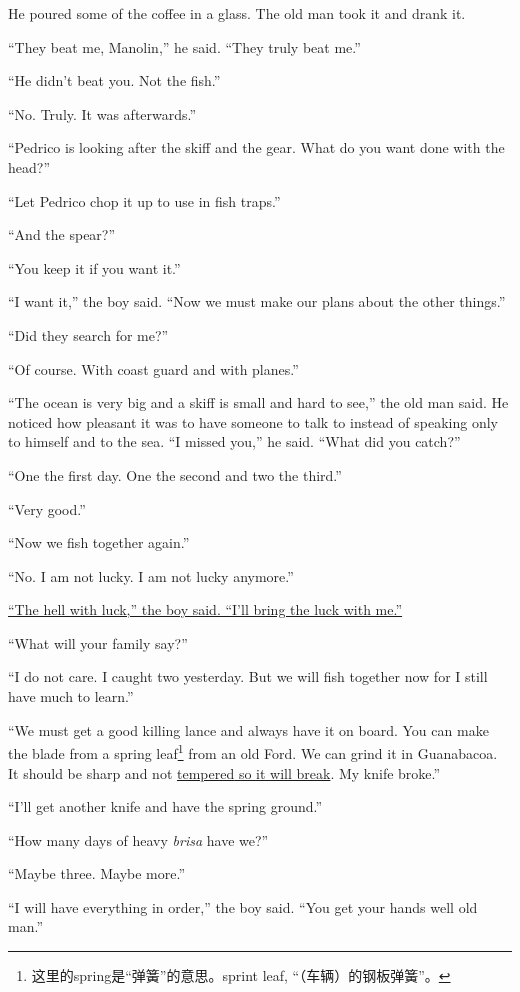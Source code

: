 He poured some of the coffee in a glass. The old man took it and drank it.

``They beat me, Manolin,'' he said. ``They truly beat me.''

``He didn't beat you. Not the fish.''

``No. Truly. It was afterwards.''

``Pedrico is looking after the skiff and the gear. What do you want done with the head?''

``Let Pedrico chop it up to use in fish traps.''

``And the spear?''

``You keep it if you want it.''

``I want it,'' the boy said. ``Now we must make our plans about the other things.''

``Did they search for me?''

``Of course. With coast guard and with planes.''

``The ocean is very big and a skiff is small and hard to see,'' the old man
said. He noticed how pleasant it was to have someone to talk to instead of
speaking only to himself and to the sea. ``I missed you,'' he said. ``What
did you catch?''

``One the first day. One the second and two the third.''

``Very good.''

``Now we fish together again.''

``No. I am not lucky. I am not lucky anymore.''

\uline{``The hell with luck,'' the boy said. ``I'll bring the luck with me.''}

``What will your family say?''

``I do not care. I caught two yesterday. But we will fish together now for I
still have much to learn.''

``We must get a good killing \gls{lance} and always have it on board. You can make
the blade from a spring leaf\footnote{这里的spring是“弹簧”的意思。sprint
  leaf, “（车辆）的钢板弹簧”。} from an old Ford. We can \gls{grind} it
in Guanabacoa. It should be sharp and not \uline{\gls{tempered} so it will break}.
My knife broke.''

``I'll get another knife and have the spring ground.''

``How many days of heavy \emph{brisa} have we?''

``Maybe three. Maybe more.''

``I will have everything in order,'' the boy said. ``You get your hands well
old man.''

